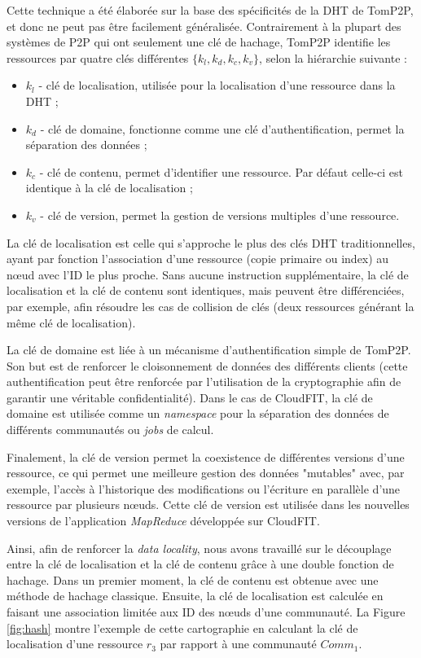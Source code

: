 Cette technique a été élaborée sur la base des spécificités de la DHT de TomP2P, et donc ne peut pas être facilement généralisée. Contrairement à la plupart des systèmes de P2P qui ont seulement une clé de hachage, TomP2P identifie les ressources par quatre clés différentes $\{k_l,k_d,k_c,k_v\}$, selon la hiérarchie suivante : 
\begin{itemize}
	\item \textit{$k_l$} - clé de localisation, utilisée pour la localisation d'une ressource dans la DHT ;
	\item \textit{$k_d$} - clé de domaine, fonctionne comme une clé d'authentification, permet la séparation des données ;
	\item \textit{$k_c$} - clé de contenu, permet d'identifier une ressource. Par défaut celle-ci est identique à la clé de localisation ;
	\item \textit{$k_v$} - clé de version, permet la gestion de versions multiples d'une ressource.
\end{itemize} 

La clé de localisation est celle qui s'approche le plus des clés DHT traditionnelles, ayant par fonction l'association d'une ressource (copie primaire ou index) au n{\oe}ud avec l'ID le plus proche. Sans aucune instruction supplémentaire, la clé de localisation et la clé de contenu sont identiques, mais peuvent être différenciées, par exemple, afin résoudre les cas de collision de clés (deux ressources générant la même clé de localisation).

La clé de domaine est liée à un mécanisme d'authentification simple de TomP2P. Son but est de renforcer le cloisonnement de données des différents clients (cette authentification peut être renforcée par l'utilisation de la cryptographie afin de garantir une véritable confidentialité). Dans le cas de CloudFIT, la clé de domaine est utilisée comme un \textit{namespace} pour la séparation des données de différents communautés ou \textit{jobs} de calcul. 

Finalement, la clé de version permet la coexistence de différentes versions d'une ressource, ce qui permet une meilleure gestion des données "mutables" avec, par exemple, l'accès à l'historique des modifications ou l'écriture en parallèle d'une ressource par plusieurs n{\oe}uds. Cette clé de version est utilisée dans les nouvelles versions de l'application \textit{MapReduce} développée sur CloudFIT.

Ainsi, afin de renforcer la \textit{data locality}, nous avons travaillé sur le découplage entre la clé de localisation et la clé de contenu grâce à une double fonction de hachage. Dans un premier moment, la clé de contenu est obtenue avec une méthode de hachage classique. Ensuite, la clé de localisation est calculée en faisant une association limitée aux ID des n{\oe}uds d'une communauté. La Figure \ref{fig:hash} montre l'exemple de cette cartographie en calculant la clé de localisation d'une ressource $r_3$ par rapport à une communauté $Comm_1$.

